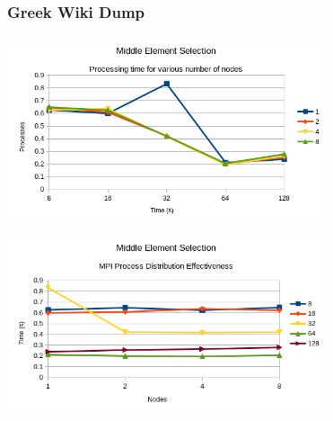 \documentclass[11pt]{article}
\begin{document}
\subsubsection{Greek Wiki Dump}
\label{sec:orgf1c4792}
\begin{center}
\includegraphics[height=200]{./charts/greek-wiki-dump/processing-time-nodes.png}
\end{center}
\begin{center}
\includegraphics[height=200]{./charts/greek-wiki-dump/process-distribution-effectiveness.png}
\end{center}
\end{document}
